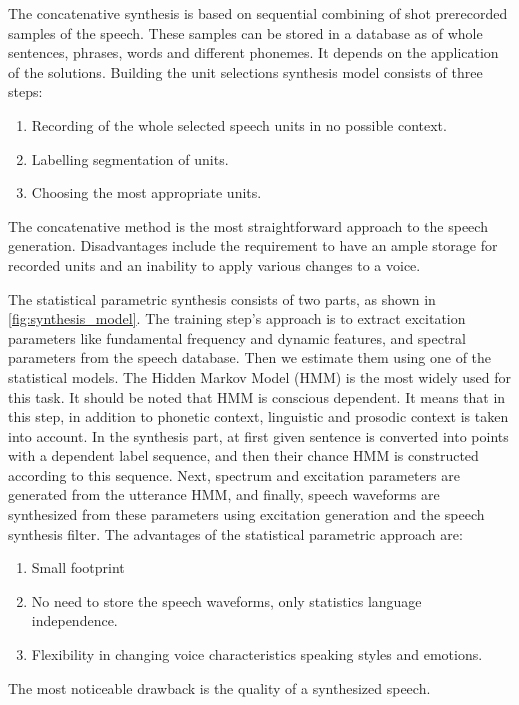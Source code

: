 The concatenative synthesis is based on sequential combining of shot prerecorded samples of the speech. These samples can be stored in a database as of whole sentences, phrases, words and different phonemes. It depends on the application of the solutions. Building the unit selections synthesis model consists of three steps:

\begin{enumerate}
    \item Recording of the whole selected speech units in no possible context.
    \item Labelling segmentation of units.
    \item Choosing the most appropriate units. 
\end{enumerate}

The concatenative method is the most straightforward approach to the speech generation. Disadvantages include the requirement to have an ample storage for recorded units and an inability to apply various changes to a voice.

The statistical parametric synthesis consists of two parts, as shown in \cref{fig:synthesis_model}. The training step's approach is to extract excitation parameters like fundamental frequency and dynamic features, and spectral parameters from the speech database. Then we estimate them using one of the statistical models. The Hidden Markov Model (HMM) is the most widely used for this task. It should be noted that HMM is conscious dependent. It means that in this step, in addition to phonetic context, linguistic and prosodic context is taken into account. In the synthesis part, at first given sentence is converted into points with a dependent label sequence, and then their chance HMM is constructed according to this sequence. Next, spectrum and excitation parameters are generated from the utterance HMM, and finally, speech waveforms are synthesized from these parameters using excitation generation and the speech synthesis filter. The advantages of the statistical parametric approach are:
\begin{enumerate}
    \item Small footprint
    \item No need to store the speech waveforms, only statistics language independence.
    \item Flexibility in changing voice characteristics speaking styles and emotions.
\end{enumerate}
The most noticeable drawback is the quality of a synthesized speech.

